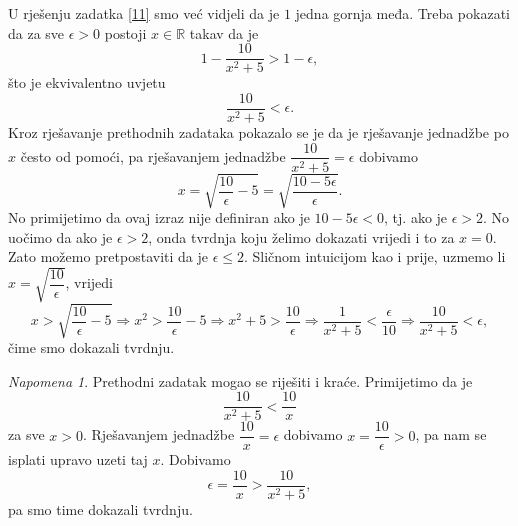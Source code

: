 \documentclass{book}
\renewenvironment{proof}{%
    \vspace{-\parskip}\begin{oldproof}%
    }{%
    \end{oldproof}%
}
\theoremstyle{definition}
\theoremstyle{definition}
\theoremstyle{remark}
\newtheorem{remark}{Napomena}
\begin{document}
\begin{proof}[Rješenje]
U rješenju zadatka \ref{11} smo već vidjeli da je $1$ jedna gornja međa. Treba pokazati da za sve $\epsilon>0$ postoji $x\in \mathbb{R}$ takav da je 
$$1-\dfrac{10}{x^2+5}>1-\epsilon,$$ 
što je ekvivalentno uvjetu $$\dfrac{10}{x^2+5}<\epsilon.$$ Kroz rješavanje prethodnih zadataka pokazalo se je da je rješavanje jednadžbe po $x$ često od pomoći, pa rješavanjem jednadžbe $\dfrac{10}{x^2+5}=\epsilon$ dobivamo $$x=\sqrt{\dfrac{10}{\epsilon}-5}=\sqrt{\dfrac{10-5\epsilon}{\epsilon}}.$$ No primijetimo da ovaj izraz nije definiran ako je $10-5\epsilon<0$, tj. ako je $\epsilon>2$. No uočimo da ako je $\epsilon>2$, onda tvrdnja koju želimo dokazati vrijedi i to za $x=0$. Zato možemo pretpostaviti da je $\epsilon\leq 2$. Sličnom intuicijom kao i prije, uzmemo li $x=\sqrt{\dfrac{10}{\epsilon}}$,
vrijedi
$$x>\sqrt{\dfrac{10}{\epsilon}-5}\Rightarrow x^2>\dfrac{10}{\epsilon}-5\Rightarrow x^2+5>\dfrac{10}{\epsilon}\Rightarrow \dfrac{1}{x^2+5}<\dfrac{\epsilon}{10}\Rightarrow \dfrac{10}{x^2+5}<\epsilon,$$
čime smo dokazali tvrdnju.
\end{proof}
\begin{remark}
Prethodni zadatak mogao se riješiti i kraće. Primijetimo da je $$\dfrac{10}{x^2+5}<\dfrac{10}{x}$$ za sve $x>0$. Rješavanjem jednadžbe $\dfrac{10}{x}=\epsilon$ dobivamo $x=\dfrac{10}{\epsilon}>0$, pa nam se isplati upravo uzeti taj $x$. Dobivamo $$\epsilon=\dfrac{10}{x}>\dfrac{10}{x^2+5},$$ pa smo time dokazali tvrdnju.
\end{remark}
\end{document}

